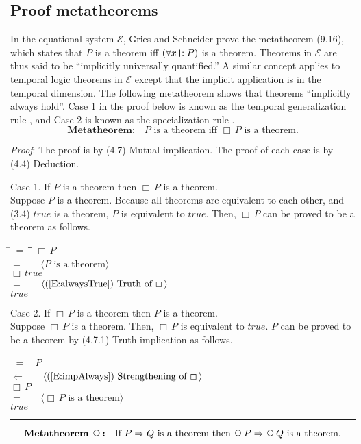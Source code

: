 \documentclass[12pt, fleqn, leqno]{article}
\newcommand{\lgap}{2pt}                             %
\newcommand{\mymathindent}{24pt}                    %
\newcommand{\impl}{\ensuremath{\Rightarrow}}        %
\newcommand{\foll}{\ensuremath{\Leftarrow}}         %
\newcommand{\Next}{\;\,\text{\raisebox{3.5pt}{\circle{6}}}}
\newcommand{\Always}{\Box\,}
\newcommand{\myqed}{\rule[-.23ex]{1.2ex}{2.0ex}}
\newcommand{\myqedtab}{\hspace{384pt}}              %
\newcommand{\thedr}{\rule[-.25ex]{.32mm}{1.75ex}}   %
\newcommand{\drrb}{\;\thedr\,{:}\;}                 %
\newcommand{\all}{\forall}                          %
\newcommand{\Gll} {\langle}                         %
\newcommand{\Ggg} {\rangle}                         %
\newcommand{\Hint}[1]     {\ \ \ $\Gll              \mbox{#1} \Ggg$ }   %
\begin{document}
\subsection{Proof metatheorems}

In the equational system $\mathcal{E}$, Gries and Schneider \cite{LADM} prove the metatheorem (9.16), which states that
$P$ is a theorem iff $(\all x\drrb P)$ is a theorem.
Theorems in $\mathcal{E}$ are thus said to be ``implicitly universally quantified.''
A similar concept applies to temporal logic theorems in $\mathcal{E}$ except that the implicit application is in the temporal dimension.
The following metatheorem shows that theorems ``implicitly always hold''.
Case 1 in the proof below is known as the temporal generalization rule \cite{Schn}, and Case 2 is known as the specialization rule \cite{Manna}.
\begin{equation}\label{E:metatheorem}
\textbf{Metatheorem:}\quad P \text{ is a theorem iff } \Always P \text{ is a theorem.}
\end{equation}

\emph{Proof}: The proof is by (4.7) Mutual implication.
The proof of each case is by (4.4) Deduction.

Case 1. If $P$ is a theorem then $\Always P$ is a theorem.\\
Suppose $P$ is a theorem.
Because all theorems are equivalent to each other, and (3.4) $true$ is a theorem, $P$ is equivalent to $true$.
Then, $\Always P$ can be proved to be a theorem as follows.
\begin{tabbing}
\hspace{\mymathindent} \= $= \;$ \= \myqedtab \= \kill
\> \> $\Always P$\\[\lgap]
\> $=$ \> \Hint{$P$ is a theorem} \\[\lgap]
\> \> $\Always true$\\[\lgap]
\> $=$ \> \Hint{(\ref{E:alwaysTrue}) Truth of $\Always$} \\[\lgap]
\> \> $true$
\end{tabbing}

Case 2. If $\Always P$ is a theorem then $P$ is a theorem.\\
Suppose $\Always P$ is a theorem.
Then, $\Always P$ is equivalent to $true$.
$P$ can be proved to be a theorem by (4.7.1) Truth implication as follows.
\begin{tabbing}
\hspace{\mymathindent} \= $= \;$ \= \myqedtab \= \kill
\> \> $P$\\[\lgap]
\> $\foll$ \> \Hint{(\ref{E:impAlways}) Strengthening of $\Always$} \\[\lgap]
\> \> $\Always P$\\[\lgap]
\> $=$ \> \Hint{$\Always P$ is a theorem} \\[\lgap]
\> \> $true$ \quad \myqed
\end{tabbing}
\begin{equation}\label{E:metaNext}
\textbf{Metatheorem $\Next$:}\quad \text{If } P\impl Q \text{ is a theorem then } \Next P\impl\Next Q \text{ is a theorem.}
\end{equation}
\end{document}
